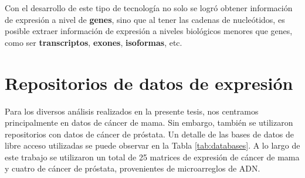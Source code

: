 \documentclass[12pt,twoside]{reedthesis}
\begin{document}
Con el desarrollo de este tipo de tecnología no solo se logró obtener información de expresión a nivel de \textbf{genes}, sino que al tener las cadenas de nucleótidos, es posible extraer información de expresión a niveles biológicos menores que genes, como ser \textbf{transcriptos}, \textbf{exones}, \textbf{isoformas}, etc.

\hypertarget{sec:repos}{%
\section{Repositorios de datos de expresión}\label{sec:repos}}

Para los diversos análisis realizados en la presente tesis, nos centramos principalmente en datos de cáncer de mama. Sin embargo, también se utilizaron repositorios con datos de cáncer de próstata. Un detalle de las bases de datos de libre acceso utilizadas se puede observar en la Tabla \ref{tab:databases}. A lo largo de este trabajo se utilizaron un total de 25 matrices de expresión de cáncer de mama y cuatro de cáncer de próstata, provenientes de microarreglos de ADN.

\par
\end{document}

